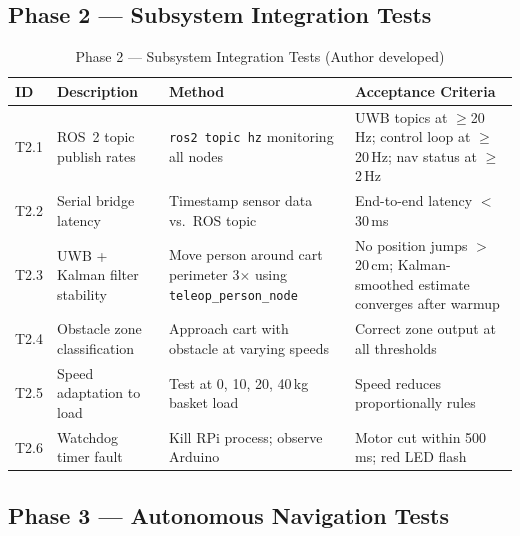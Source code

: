 \subsection{Phase 2 --- Subsystem Integration Tests}

\begin{table}[!ht]
\caption{Phase 2 --- Subsystem Integration Tests (Author developed)}
\label{tab:phase2}
\centering
\footnotesize
\begin{tabular}{p{0.6cm} p{1.8cm} p{1.8cm} p{2.4cm}}
\toprule
\textbf{ID} & \textbf{Description} & \textbf{Method} & \textbf{Acceptance Criteria} \\
\midrule
T2.1 & ROS~2 topic publish rates & \texttt{ros2 topic hz} monitoring all nodes & UWB topics at $\geq$20\,Hz; control loop at $\geq$20\,Hz; nav status at $\geq$2\,Hz \\
T2.2 & Serial bridge latency & Timestamp sensor data vs.\ ROS topic & End-to-end latency $<$30\,ms \\
T2.3 & UWB + Kalman filter stability & Move person around cart perimeter 3$\times$ using \texttt{teleop\_person\_node} & No position jumps $>$20\,cm; Kalman-smoothed estimate converges after warmup \\
T2.4 & Obstacle zone classification & Approach cart with obstacle at varying speeds & Correct zone output at all thresholds \\
T2.5 & Speed adaptation to load & Test at 0, 10, 20, 40\,kg basket load & Speed reduces proportionally rules \\
T2.6 & Watchdog timer fault & Kill RPi process; observe Arduino & Motor cut within 500\,ms; red LED flash \\
\bottomrule
\end{tabular}
\end{table}

\subsection{Phase 3 --- Autonomous Navigation Tests}

